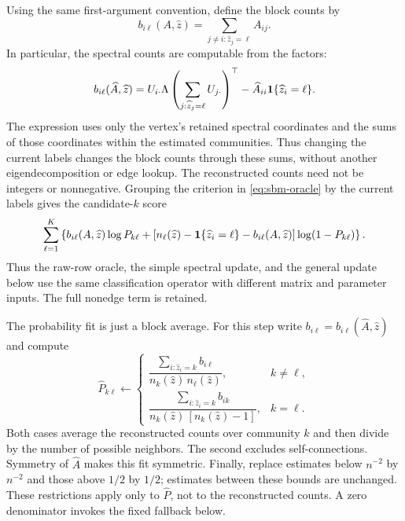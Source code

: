 Using the same first-argument convention, define the block counts by
\begin{equation}\label{eq:simple-counts}
 b_{i\ell}(A,\widehat z)=\sum_{j\ne i:\widehat z_j=\ell}A_{ij}.
\end{equation}
In particular, the spectral counts are computable from the factors:
\begin{equation}\label{eq:simple-factor-counts}
 b_{i\ell}(\widehat A,\widehat z)
 =U_{i\cdot}\Lambda
       \left(\sum_{j:\widehat z_j=\ell}U_{j\cdot}\right)^\top
       -\widehat A_{ii}\mathbf1\{\widehat z_i=\ell\}.
\end{equation}
The expression uses only the vertex's retained spectral coordinates
and the sums of those coordinates within the estimated communities.
Thus changing the current labels changes the block counts through
these sums, without another eigendecomposition or edge lookup.
The reconstructed counts need not be integers or nonnegative. Grouping the criterion
in \eqref{eq:sbm-oracle} by the current labels gives the candidate-$k$
score
\begin{equation}\label{eq:simple-score}
 \sum_{\ell=1}^K\left\{
 b_{i\ell}(A,\widehat z)\log P_{k\ell}
 +[n_\ell(\widehat z)-\mathbf1\{\widehat z_i=\ell\}-b_{i\ell}(A,\widehat z)]
       \log(1-P_{k\ell})\right\}.
\end{equation}
Thus the raw-row oracle, the simple spectral update, and the general
update below use the same classification operator with different
matrix and parameter inputs. The full nonedge term is retained.

The probability fit is just a block average. For this step write
$b_{i\ell}=b_{i\ell}(\widehat A,\widehat z)$ and compute
\begin{equation}\label{eq:block-average-operator}
 \widehat P_{k\ell}\leftarrow
 \begin{cases}
 \dfrac{\sum_{i:\widehat z_i=k} b_{i\ell}}
       {n_k(\widehat z)\,n_\ell(\widehat z)},
       & k\ne\ell,\\[8pt]
 \dfrac{\sum_{i:\widehat z_i=k} b_{ik}}
       {n_k(\widehat z)\,[n_k(\widehat z)-1]},
       & k=\ell.
 \end{cases}
\end{equation}
Both cases average the reconstructed counts over community $k$ and
then divide by the number of possible neighbors. The second excludes
self-connections. Symmetry of $\widehat A$ makes this fit symmetric. Finally, replace estimates below $n^{-2}$
by $n^{-2}$ and those above $1/2$ by $1/2$; estimates between these
bounds are unchanged. These restrictions apply only to $\widehat P$,
not to the reconstructed counts. A zero denominator invokes the
fixed fallback below.

